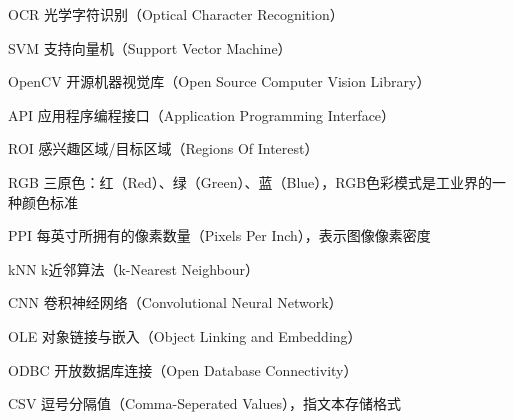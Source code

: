 ﻿\begin{denotation}
  \item[OCR] 光学字符识别（Optical Character Recognition）
  \item[SVM] 支持向量机（Support Vector Machine）
  \item[OpenCV] 开源机器视觉库（Open Source Computer Vision Library）
  \item[API] 应用程序编程接口（Application Programming Interface）
  \item[ROI] 感兴趣区域/目标区域（Regions Of Interest）
  \item[RGB] 三原色：红（Red）、绿（Green）、蓝（Blue），RGB色彩模式是工业界的一种颜色标准
  \item[PPI] 每英寸所拥有的像素数量（Pixels Per Inch），表示图像像素密度
  \item[kNN] k近邻算法（k-Nearest Neighbour）
  \item[CNN] 卷积神经网络（Convolutional Neural Network）
  \item[OLE] 对象链接与嵌入（Object Linking and Embedding）
  \item[ODBC] 开放数据库连接（Open Database Connectivity）
  \item[CSV] 逗号分隔值（Comma-Seperated Values），指文本存储格式
\end{denotation}
